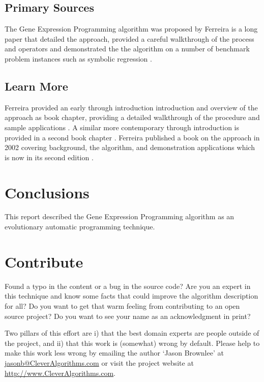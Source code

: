\documentclass[a4paper, 11pt]{article}
\makeatletter
\newcommand{\myreportauthor}{Jason Brownlee}
\newcommand{\myreportemail}{jasonb@CleverAlgorithms.com}
\newcommand{\myreportwebsite}{http://www.CleverAlgorithms.com}
\makeatother
\begin{document}
% 
% 
\subsection{Primary Sources}
The Gene Expression Programming algorithm was proposed by Ferreira is a long paper that detailed the approach, provided a careful walkthrough of the process and operators and demonstrated the the algorithm on a number of benchmark problem instances such as symbolic regression \cite{Ferreira2001}.

% 
% 
\subsection{Learn More}
Ferreira provided an early through introduction introduction and overview of the approach as book chapter, providing a detailed walkthrough of the procedure and sample applications \cite{Ferreira2002}. A similar more contemporary through introduction is provided in a second book chapter \cite{Ferreira2005}.
Ferreira published a book on the approach in 2002 covering background, the algorithm, and demonstration applications which is now in its second edition \cite{Ferreira2006}.


% 
% 
\section{Conclusions}
\label{sec:conclusions}
This report described the Gene Expression Programming algorithm as an evolutionary automatic programming technique.

% 
% 
\section{Contribute}
\label{sec:contribute}
Found a typo in the content or a bug in the source code? 
Are you an expert in this technique and know some facts that could improve the algorithm description for all?
Do you want to get that warm feeling from contributing to an open source project? 
Do you want to see your name as an acknowledgment in print?

Two pillars of this effort are i) that the best domain experts are people outside of the project, and ii) that this work is (somewhat) wrong by default. 
Please help to make this work less wrong by emailing the author `\myreportauthor' at \url{\myreportemail} or visit the project website at \url{\myreportwebsite}.



\end{document}
